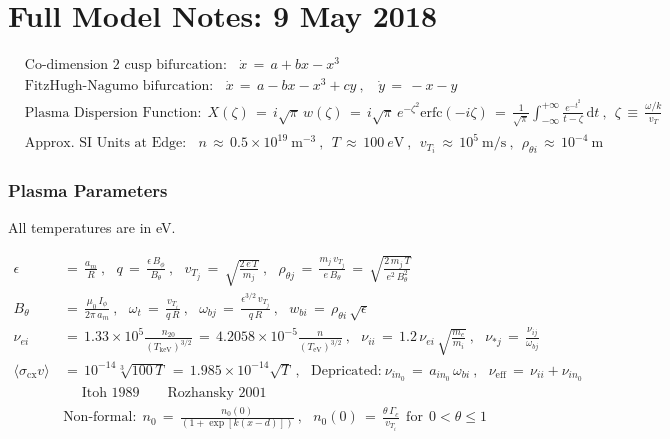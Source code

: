 \documentclass[a4paper,8pt]{article}
\date{}
\begin{document}
\section{Full Model Notes: 9 May
2018}\label{full-model-notes-9-may-2018}

\small

\begin{align}
    &\text{Co-dimension 2 cusp bifurcation:} ~~~~ \dot{x} \,=\, a + bx - x^3 \\
    &\text{FitzHugh-Nagumo bifurcation:} ~~~~ \dot{x} \,=\, a - bx - x^3 + cy~,
        ~~~~ \dot{y} \,=\, -x - y \\
    &\text{Plasma Dispersion Function:} ~~ X(\zeta) \,=\, i \sqrt{\pi}\,w(\zeta)
        \,=\, i \sqrt{\pi} \, e^{-\zeta^2} \text{erfc}(-i \zeta)
        \,=\, \frac{1}{\sqrt{\pi}} \int_{-\infty}^{+\infty}
        \frac{e^{-t^2}}{t - \zeta} \, \text{d}t~,~~
        \zeta \,\equiv\, \frac{\omega/k}{v_T} \\
    &\text{Approx. SI Units at Edge:} ~~~~ n \,\approx\, 0.5\times 10^{19}~\text{m}^{-3}~,
        ~~ T \,\approx\, 100~e\text{V}~,~~ v_{T_i} \,\approx\, 10^5~\text{m}/\text{s}~,
        ~~ \rho_{\theta i} \,\approx\, 10^{-4}~\text{m}
\end{align}

\normalsize

\subsubsection{Plasma Parameters}\label{plasma-parameters}

All temperatures are in eV. \small

\begin{align}
    \epsilon \,&=\, \frac{a_m}{R}~,~~~ q \,=\,
        \frac{\epsilon \, B_\phi}{B_\theta}~,~~~ v_{T_j} \,=\,
        \sqrt{\frac{2 \, e \, T}{m_j}}~,~~~ \rho_{\theta j} \,=\,
        \frac{m_j \, v_{T_j}}{e \, B_\theta} \,=\,
        \sqrt{\frac{2 \, m_j \, T}{e^2 \, B_\theta^2}} \\
     B_\theta \,&=\, \frac{\mu_0 \, I_\phi}{2 \pi \, a_m}~,~~~ \omega_t \,=\,
        \frac{v_{T_i}}{q\,R}~,~~~ \omega_{bj} \,=\,
        \frac{\epsilon^{3/2} \, v_{T_j}}{q \, R}~,~~~ w_{bi} \,=\,
        \rho_{\theta i} \, \sqrt{\epsilon} \\
    \nu_{ei} \,&=\, 1.33\times 10^5 \frac{n_{20}}{(T_\text{keV})^{3/2}}
        \,=\, 4.2058\times 10^{-5} \frac{n}{(T_\text{eV})^{3/2}}~,~~~
        \nu_{ii} \,=\, 1.2\, \nu_{ei} \, \sqrt{\frac{m_e}{m_i}}~,~~~
        \nu_{*j} \,=\, \frac{\nu_{ij}}{\omega_{bj}} \\
    \langle \sigma_\text{cx} v \rangle \,&=\, 10^{-14} \sqrt[3]{100 \, T}
        \,=\, 1.985\times 10^{-14} \sqrt{T}~,~~~
        \text{Depricated:}~\nu_{in_0} \,=\, a_{in_0} \, \omega_{bi}~,~~~
        \nu_\text{eff} \,=\, \nu_{ii} + \nu_{in_0} \\
        \nonumber &~~~~~~\text{Itoh 1989} ~~~~~~~~~ \text{Rozhansky 2001} \\
    &\text{Non-formal:} ~~ n_0 \,=\, \frac{n_0(0)}
        {\left(1 + \exp\left[k(x - d)\right]\right)}~,~~~
        n_0(0) \,=\, \frac{\theta \, \Gamma_c}{v_{T_i}} ~~ \text{for} ~~
        0 < \theta \leq 1
\end{align}
\end{document}
